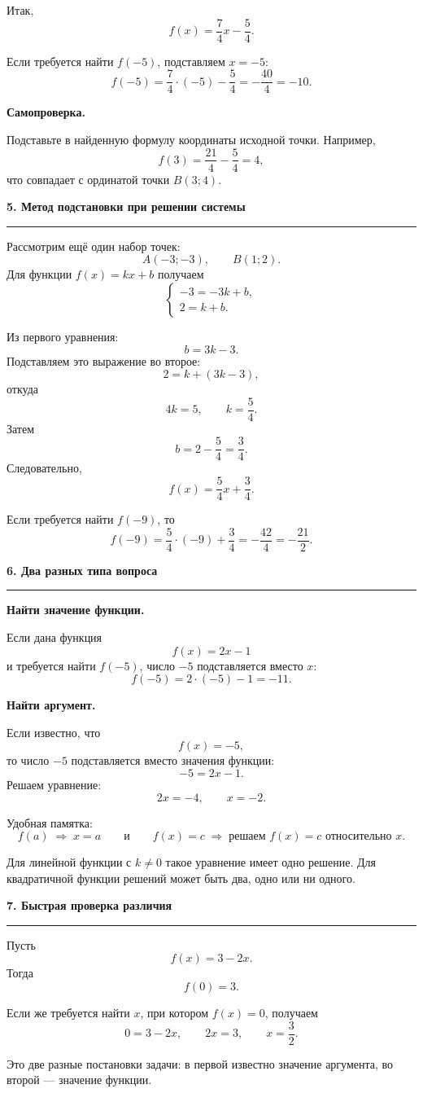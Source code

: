 \documentclass[a4paper,12pt]{article}
\newcommand{\topic}[1]{%
  \Needspace{8\baselineskip}%
  \par\vspace{0.8em}
  {\large\bfseries\color{darkaccent}#1}\par
  \vspace{0.2em}
  {\color{accent}\rule{\linewidth}{0.6pt}}\par
  \vspace{0.25em}
}
\newcommand{\keyidea}[1]{%
  \par\smallskip
  {\bfseries\color{darkaccent}#1}\enspace
}
\begin{document}
Итак,
\[
\boxed{f(x)=\frac74x-\frac54}.
\]

Если требуется найти \(f(-5)\), подставляем \(x=-5\):
\[
f(-5)=\frac74\cdot(-5)-\frac54=-\frac{40}{4}=-10.
\]

\keyidea{Самопроверка.}
Подставьте в найденную формулу координаты исходной точки. Например,
\[
f(3)=\frac{21}{4}-\frac54=4,
\]
что совпадает с ординатой точки \(B(3;4)\).

\topic{5. Метод подстановки при решении системы}

Рассмотрим ещё один набор точек:
\[
A(-3;-3),\qquad B(1;2).
\]
Для функции \(f(x)=kx+b\) получаем
\[
\begin{cases}
-3=-3k+b,\\
2=k+b.
\end{cases}
\]

Из первого уравнения:
\[
b=3k-3.
\]
Подставляем это выражение во второе:
\[
2=k+(3k-3),
\]
откуда
\[
4k=5,\qquad k=\frac54.
\]
Затем
\[
b=2-\frac54=\frac34.
\]
Следовательно,
\[
\boxed{f(x)=\frac54x+\frac34}.
\]

Если требуется найти \(f(-9)\), то
\[
f(-9)=\frac54\cdot(-9)+\frac34=-\frac{42}{4}=-\frac{21}{2}.
\]

\topic{6. Два разных типа вопроса}

\keyidea{Найти значение функции.}
Если дана функция
\[
f(x)=2x-1
\]
и требуется найти \(f(-5)\), число \(-5\) подставляется вместо \(x\):
\[
f(-5)=2\cdot(-5)-1=-11.
\]

\keyidea{Найти аргумент.}
Если известно, что
\[
f(x)=-5,
\]
то число \(-5\) подставляется вместо значения функции:
\[
-5=2x-1.
\]
Решаем уравнение:
\[
2x=-4,\qquad x=-2.
\]

Удобная памятка:
\[
\boxed{f(a)\;\Longrightarrow\;x=a}
\qquad\text{и}\qquad
\boxed{f(x)=c\;\Longrightarrow\;\text{решаем }f(x)=c\text{ относительно }x}.
\]

Для линейной функции с \(k\ne0\) такое уравнение имеет одно решение. Для квадратичной функции решений может быть два, одно или ни одного.

\topic{7. Быстрая проверка различия}

Пусть
\[
f(x)=3-2x.
\]
Тогда
\[
f(0)=3.
\]

Если же требуется найти \(x\), при котором \(f(x)=0\), получаем
\[
0=3-2x,
\qquad
2x=3,
\qquad
x=\frac32.
\]

Это две разные постановки задачи: в первой известно значение аргумента, во второй --- значение функции.

\end{document}
